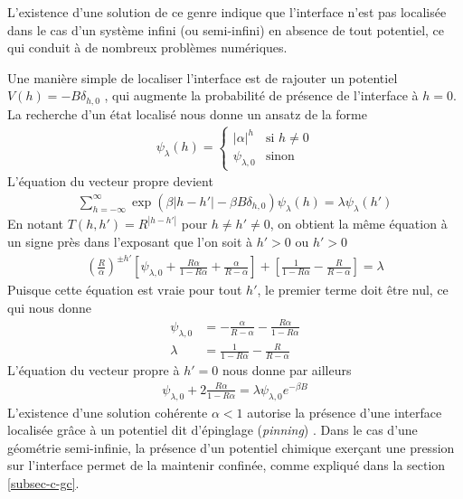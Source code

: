 L'existence d'une solution de ce genre indique que l'interface n'est pas localisée dans le cas d'un système infini (ou semi-infini) en absence de tout potentiel, ce qui conduit à de nombreux problèmes numériques. 

Une manière simple de localiser l'interface est de rajouter un potentiel $V(h) = -B \delta_{h,0}$ \cite{chui_pinning_1999,chalker_pinning_1981,chalker_pinning_1982}, qui augmente la probabilité de présence de l'interface à $h=0$. La recherche d'un état localisé nous donne un ansatz de la forme 
\begin{align}
	\psi_\lambda(h) = \begin{cases} |\alpha|^h & \text{si } h \neq 0 \\ \psi_{\lambda,0} & \text{sinon} \end{cases} 
\end{align}
L'équation du vecteur propre devient
\begin{align}
	\sum_{h=-\infty}^\infty \exp(\beta |h-h'|- \beta B \delta_{h,0}) \psi_\lambda(h) = \lambda \psi_\lambda(h')
\end{align}
En notant $T(h,h') = R^{|h-h'|}$ pour $h \neq h' \neq 0$,  on obtient la même équation à un signe près dans l'exposant que l'on soit à $h'\greater 0$ ou $h' \greater 0$
\begin{align}
	\left( \frac{R}{\alpha} \right)^{\pm h'} \left[ \psi_{\lambda,0} + \frac{R \alpha}{1 - R \alpha} + \frac{\alpha}{R - \alpha} \right] + \left[ \frac{1}{1-R \alpha} - \frac{R}{R-\alpha} \right] = \lambda
\end{align}
Puisque cette équation est vraie pour tout $h'$, le premier terme doit être nul, ce qui nous donne
\begin{align}
	\psi_{\lambda,0} &= - \frac{\alpha}{R-\alpha}-\frac{R \alpha}{1-R \alpha} \\
	\lambda &= \frac{1}{1-R \alpha} - \frac{R}{R-\alpha}
\end{align}
L'équation du vecteur propre à $h'=0$ nous donne par ailleurs 
\begin{align}
	\psi_{\lambda,0} + 2 \frac{R \alpha}{1-R \alpha} = \lambda \psi_{\lambda,0} e^{-\beta B}
\end{align}
L'existence d'une solution cohérente $\alpha \less 1$ autorise la présence d'une interface localisée grâce à un potentiel dit d'épinglage (\textit{pinning}) \cite{burkhardt_localisation-delocalisation_1981,kroll_solid--solid_1981,kroll_pinning_1982,kroll_interface_1983}.
Dans le cas d'une géométrie semi-infinie, la présence d'un potentiel chimique exerçant une pression sur l'interface permet de la maintenir confinée, comme expliqué dans la section \ref{subsec-c-gc}.

